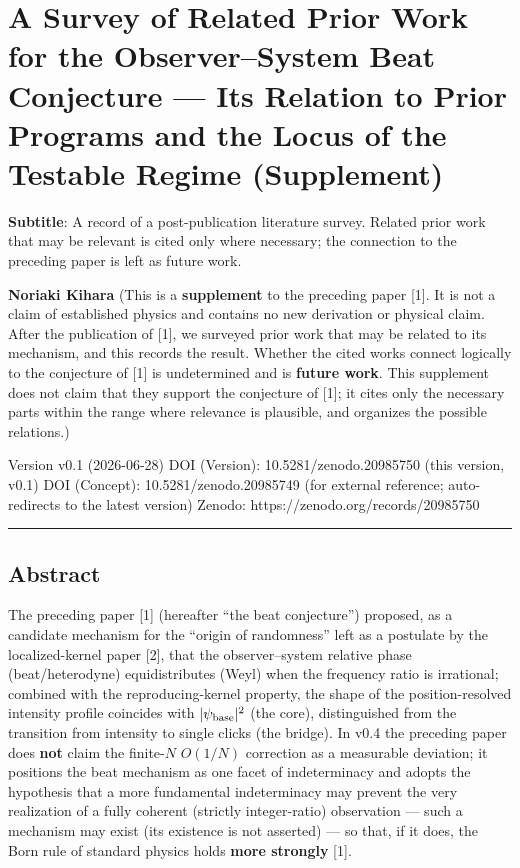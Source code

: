 \documentclass[
]{ltjsarticle}
\author{}
\date{}
\begin{document}
\section{A Survey of Related Prior Work for the Observer--System Beat
Conjecture --- Its Relation to Prior Programs and the Locus of the
Testable Regime
(Supplement)}\label{a-survey-of-related-prior-work-for-the-observersystem-beat-conjecture-its-relation-to-prior-programs-and-the-locus-of-the-testable-regime-supplement}

\textbf{Subtitle}: A record of a post-publication literature survey.
Related prior work that may be relevant is cited only where necessary;
the connection to the preceding paper is left as future work.

\textbf{Noriaki Kihara} (This is a \textbf{supplement} to the preceding
paper {[}1{]}. It is not a claim of established physics and contains no
new derivation or physical claim. After the publication of {[}1{]}, we
surveyed prior work that may be related to its mechanism, and this
records the result. Whether the cited works connect logically to the
conjecture of {[}1{]} is undetermined and is \textbf{future work}. This
supplement does not claim that they support the conjecture of {[}1{]};
it cites only the necessary parts within the range where relevance is
plausible, and organizes the possible relations.)

Version v0.1 (2026-06-28) DOI (Version): 10.5281/zenodo.20985750 (this
version, v0.1) DOI (Concept): 10.5281/zenodo.20985749 (for external
reference; auto-redirects to the latest version) Zenodo:
https://zenodo.org/records/20985750

\begin{center}\rule{0.5\linewidth}{0.5pt}\end{center}

\subsection{Abstract}\label{abstract}

The preceding paper {[}1{]} (hereafter ``the beat conjecture'')
proposed, as a candidate mechanism for the ``origin of randomness'' left
as a postulate by the localized-kernel paper {[}2{]}, that the
observer--system relative phase (beat/heterodyne) equidistributes (Weyl)
when the frequency ratio is irrational; combined with the
reproducing-kernel property, the shape of the position-resolved
intensity profile coincides with \(|\psi_{\rm base}|^2\) (the core),
distinguished from the transition from intensity to single clicks (the
bridge). In v0.4 the preceding paper does \textbf{not} claim the
finite-\(N\) \(O(1/N)\) correction as a measurable deviation; it
positions the beat mechanism as one facet of indeterminacy and adopts
the hypothesis that a more fundamental indeterminacy may prevent the
very realization of a fully coherent (strictly integer-ratio)
observation --- such a mechanism may exist (its existence is not
asserted) --- so that, if it does, the Born rule of standard physics
holds \textbf{more strongly} {[}1{]}.
\end{document}
